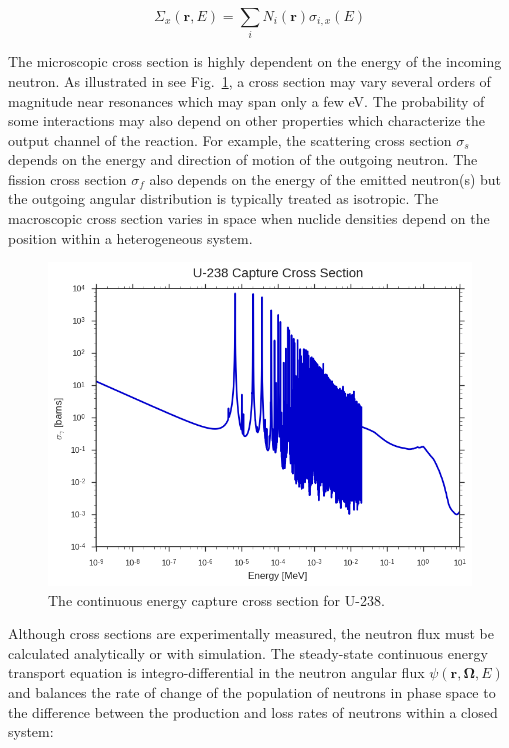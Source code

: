\begin{dmath}
\label{eqn:chap2-macro-xs-sum}
\Sigma_{x}(\mathbf{r},E) = \sum_{i}N_{i}(\mathbf{r})\sigma_{i,x}(E)
\end{dmath}

The microscopic cross section is highly dependent on the energy of the incoming neutron. As illustrated in see Fig.~\ref{fig:chap2-u238-xs}, a cross section may vary several orders of magnitude near resonances which may span only a few eV. The probability of some interactions may also depend on other properties which characterize the output channel of the reaction. For example, the scattering cross section $\sigma_{s}$ depends on the energy and direction of motion of the outgoing neutron. The fission cross section $\sigma_{f}$ also depends on the energy of the emitted neutron(s) but the outgoing angular distribution is typically treated as isotropic. The macroscopic cross section varies in space when nuclide densities depend on the position within a heterogeneous system.

\begin{figure}[H]
  \centering
  \includegraphics[width=0.8\linewidth]{figures/mgxs/u238-capture-xs}
\caption[U-238 capture cross section]{The continuous energy capture cross section for U-238.}
\label{fig:chap2-u238-xs}
\end{figure}
 
Although cross sections are experimentally measured, the neutron flux must be calculated analytically or with simulation. The steady-state continuous energy transport equation is integro-differential in the neutron angular flux $\psi(\mathbf{r},\mathbf{\Omega},E)$ and balances the rate of change of the population of neutrons in phase space to the difference between the production and loss rates of neutrons within a closed system:

